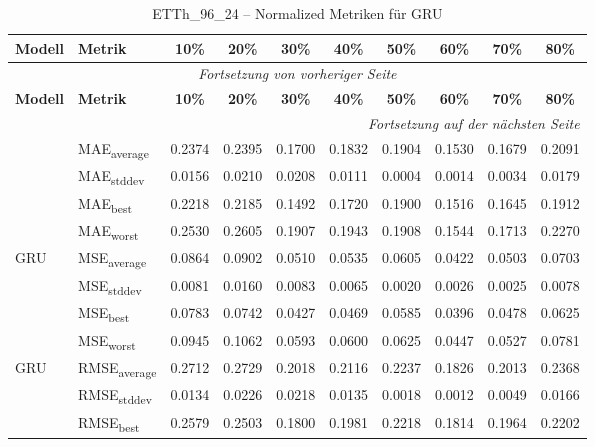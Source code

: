 {\small
\begin{longtable}{l l c c c c c c c c}
    \toprule
    \textbf{Modell} & \textbf{Metrik} & \textbf{10\%} & \textbf{20\%} & \textbf{30\%} & \textbf{40\%} & \textbf{50\%} & \textbf{60\%} & \textbf{70\%} & \textbf{80\%} \\
    \midrule
    \endfirsthead
    \multicolumn{10}{c}{\textit{Fortsetzung von vorheriger Seite}} \\
    \toprule
    \textbf{Modell} & \textbf{Metrik} & \textbf{10\%} & \textbf{20\%} & \textbf{30\%} & \textbf{40\%} & \textbf{50\%} & \textbf{60\%} & \textbf{70\%} & \textbf{80\%} \\
    \midrule
    \endhead
    \midrule
    \multicolumn{10}{r}{\textit{Fortsetzung auf der nächsten Seite}} \\
    \midrule
    \endfoot
    \bottomrule
    \caption{ETTh_96_24 -- Normalized Metriken für GRU}
    \label{tab:etth_96_24_normalized_gru}
    \endlastfoot
\multirow{4}{*}{GRU} & MAE\textsubscript{average} & 0.2374 & 0.2395 & 0.1700 & 0.1832 & 0.1904 & 0.1530 & 0.1679 & 0.2091 \\
 & MAE\textsubscript{stddev} & 0.0156 & 0.0210 & 0.0208 & 0.0111 & 0.0004 & 0.0014 & 0.0034 & 0.0179 \\
 & MAE\textsubscript{best} & 0.2218 & 0.2185 & 0.1492 & 0.1720 & 0.1900 & 0.1516 & 0.1645 & 0.1912 \\
 & MAE\textsubscript{worst} & 0.2530 & 0.2605 & 0.1907 & 0.1943 & 0.1908 & 0.1544 & 0.1713 & 0.2270 \\
\cmidrule(lr){2-10}
\multirow{4}{*}{GRU} & MSE\textsubscript{average} & 0.0864 & 0.0902 & 0.0510 & 0.0535 & 0.0605 & 0.0422 & 0.0503 & 0.0703 \\
 & MSE\textsubscript{stddev} & 0.0081 & 0.0160 & 0.0083 & 0.0065 & 0.0020 & 0.0026 & 0.0025 & 0.0078 \\
 & MSE\textsubscript{best} & 0.0783 & 0.0742 & 0.0427 & 0.0469 & 0.0585 & 0.0396 & 0.0478 & 0.0625 \\
 & MSE\textsubscript{worst} & 0.0945 & 0.1062 & 0.0593 & 0.0600 & 0.0625 & 0.0447 & 0.0527 & 0.0781 \\
\cmidrule(lr){2-10}
\multirow{4}{*}{GRU} & RMSE\textsubscript{average} & 0.2712 & 0.2729 & 0.2018 & 0.2116 & 0.2237 & 0.1826 & 0.2013 & 0.2368 \\
 & RMSE\textsubscript{stddev} & 0.0134 & 0.0226 & 0.0218 & 0.0135 & 0.0018 & 0.0012 & 0.0049 & 0.0166 \\
 & RMSE\textsubscript{best} & 0.2579 & 0.2503 & 0.1800 & 0.1981 & 0.2218 & 0.1814 & 0.1964 & 0.2202 \\

\end{longtable}}
